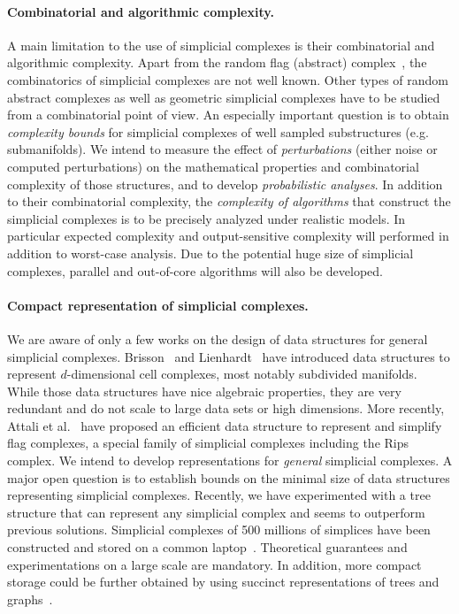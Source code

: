 \paragraph{Combinatorial and algorithmic complexity.}
A main limitation to the use of simplicial complexes is their combinatorial and algorithmic complexity.  Apart from the random flag (abstract) complex~\cite{CambridgeJournals:2077252}, the combinatorics of simplicial complexes are not well known. Other types of random abstract complexes as well as geometric simplicial complexes have to be studied from a combinatorial point of view. An especially important question is to obtain {\em complexity bounds} for simplicial complexes of well sampled substructures (e.g. submanifolds).  We intend to measure the effect of {\em perturbations} (either noise or computed perturbations) on the mathematical properties and combinatorial complexity of those structures, and to develop {\em probabilistic analyses}. 
In addition to their combinatorial complexity, the {\em complexity of algorithms} that construct the simplicial complexes is to be precisely analyzed under realistic models. In particular expected complexity and output-sensitive complexity will performed in addition to worst-case analysis. Due to the potential huge size of simplicial complexes, parallel and out-of-core algorithms will also be developed. %


\paragraph{Compact representation of simplicial complexes.} We are aware of only a few works on the design of data structures for general simplicial complexes. Brisson~\cite{Brisson:1989:RGS:73833.73858} and Lienhardt~\cite{DBLP:journals/ijcga/Lienhardt94} have introduced data structures to represent $d$-dimensional cell complexes, most notably subdivided manifolds. While those data structures have nice algebraic properties, they are very redundant and do not scale to large data sets or high dimensions. More recently, Attali et al.~\cite{Attali2011} have proposed an efficient data structure to represent and simplify flag complexes, a special family of simplicial complexes including the Rips complex.  We intend to develop representations for {\em general} simplicial complexes. 
A major open question is to establish bounds on the minimal size of data structures representing simplicial complexes.
 Recently, we have experimented with a tree structure that can represent any simplicial complex and seems to outperform previous solutions. Simplicial complexes of 500 millions of simplices have been constructed and stored on a common laptop~\cite{bm-dssc-2012}.  Theoretical guarantees and experimentations on a large scale are mandatory. In addition, more compact storage could be further obtained by using succinct representations of trees and graphs~\cite{Ferragina:2005:SLT:1097112.1097456,Munro:2002:SRB:586840.586885}. 










